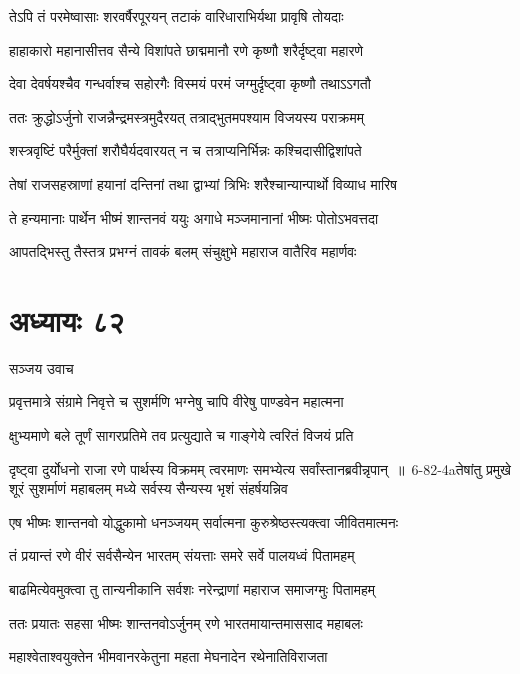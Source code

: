 \twolineshloka
{तेऽपि तं परमेष्वासाः शरवर्षैरपूरयन्}
{तटाकं वारिधाराभिर्यथा प्रावृषि तोयदाः}


\twolineshloka
{हाहाकारो महानासीत्तव सैन्ये विशांपते}
{छाद्ममानौ रणे कृष्णौ शरैर्दृष्ट्वा महारणे}


\twolineshloka
{देवा देवर्षयश्चैव गन्धर्वाश्च सहोरगैः}
{विस्मयं परमं जग्मुर्दृष्ट्वा कृष्णौ तथाऽऽगतौ}


\twolineshloka
{ततः क्रुद्धोऽर्जुनो राजन्नैन्द्रमस्त्रमुदैरयत्}
{तत्राद्भुतमपश्याम विजयस्य पराक्रमम्}


\twolineshloka
{शस्त्रवृष्टिं परैर्मुक्तां शरौघैर्यदवारयत्}
{न च तत्राप्यनिर्भिन्नः कश्चिदासीद्विशांपते}


\twolineshloka
{तेषां राजसहस्राणां हयानां दन्तिनां तथा}
{द्वाभ्यां त्रिभिः शरैश्चान्यान्पार्थो विव्याध मारिष}


\twolineshloka
{ते हन्यमानाः पार्थेन भीष्मं शान्तनवं ययुः}
{अगाधे मञ्जमानानां भीष्मः पोतोऽभवत्तदा}


\twolineshloka
{आपतद्भिस्तु तैस्तत्र प्रभग्नं तावकं बलम्}
{संचुक्षुभे महाराज वातैरिव महार्णवः}


\chapter{अध्यायः ८२}
\twolineshloka
{सञ्जय उवाच}
{}


\twolineshloka
{प्रवृत्तमात्रे संग्रामे निवृत्ते च सुशर्मणि}
{भग्नेषु चापि वीरेषु पाण्डवेन महात्मना}


\twolineshloka
{क्षुभ्यमाणे बले तूर्णं सागरप्रतिमे तव}
{प्रत्युद्याते च गाङ्गेये त्वरितं विजयं प्रति}


\threelineshloka
{दृष्ट्वा दुर्योधनो राजा रणे पार्थस्य विक्रमम्}
{त्वरमाणः समभ्येत्य सर्वांस्तानब्रवीन्नृपान् ॥ 6-82-4aतेषांतु प्रमुखे शूरं सुशर्माणं महाबलम्}
{मध्ये सर्वस्य सैन्यस्य भृशं संहर्षयन्निव}


\twolineshloka
{एष भीष्मः शान्तनवो योद्धुकामो धनञ्जयम्}
{सर्वात्मना कुरुश्रेष्ठस्त्यक्त्वा जीवितमात्मनः}


\twolineshloka
{तं प्रयान्तं रणे वीरं सर्वसैन्येन भारतम्}
{संयत्ताः समरे सर्वे पालयध्वं पितामहम्}


\twolineshloka
{बाढमित्येवमुक्त्वा तु तान्यनीकानि सर्वशः}
{नरेन्द्राणां महाराज समाजग्मुः पितामहम्}


\twolineshloka
{ततः प्रयातः सहसा भीष्मः शान्तनवोऽर्जुनम्}
{रणे भारतमायान्तमाससाद महाबलः}


\twolineshloka
{महाश्वेताश्वयुक्तेन भीमवानरकेतुना}
{महता मेघनादेन रथेनातिविराजता}


